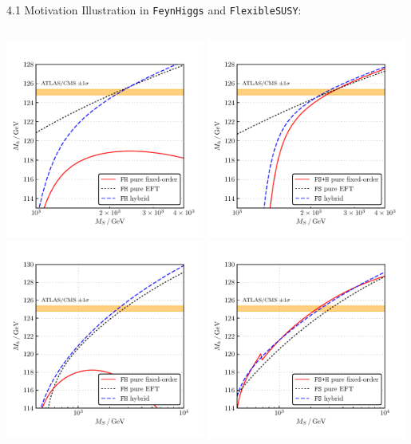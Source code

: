 \documentclass[hyperref={pdfpagelabels=false},ngerman]{beamer}
\newcommand{\fs}{\texttt{FlexibleSUSY}\xspace}
\newcommand{\FH}{\texttt{FeynHiggs}\xspace}
\begin{document}
\begin{frame}{4.1 Motivation}
  Illustration in \FH and \fs:
  \begin{columns}
    \begin{column}{0.6\textwidth}
      \begin{center}
        \includegraphics[width=0.49\textwidth]{plots/kuts-9/FH_1}
        \includegraphics[width=0.49\textwidth]{plots/kuts-9/FS_3L}\\
        \includegraphics[width=0.49\textwidth]{plots/kuts-9/FH_2}
        \includegraphics[width=0.49\textwidth]{plots/kuts-9/FS_3L_2}

\end{center}
\end{column}
\end{columns}
\end{frame}
\end{document}
